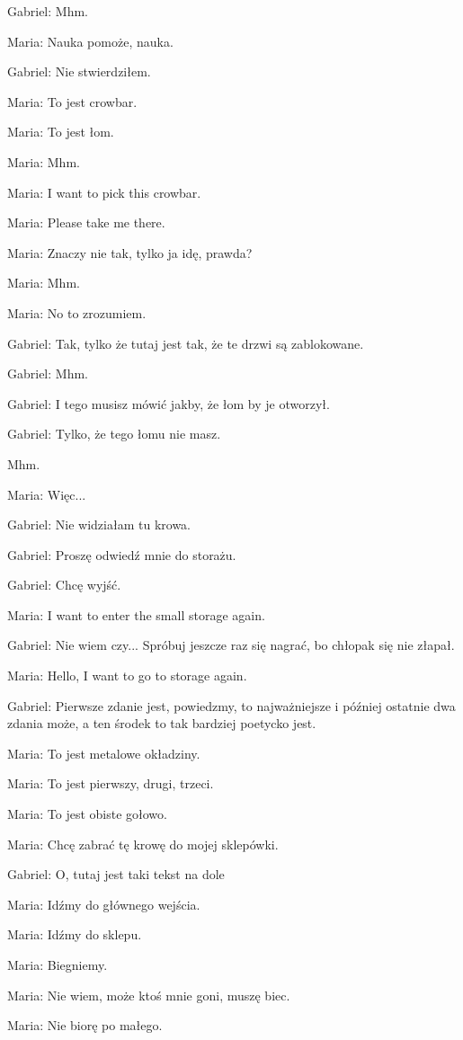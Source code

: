 Gabriel: Mhm.

Maria: Nauka pomoże, nauka.

Gabriel: Nie stwierdziłem.

Maria: To jest crowbar.

Maria: To jest łom.

Maria: Mhm.

Maria: I want to pick this crowbar.

Maria: Please take me there.

Maria: Znaczy nie tak, tylko ja idę, prawda?

Maria: Mhm.

Maria: No to zrozumiem.

Gabriel: Tak, tylko że tutaj jest tak, że te drzwi są zablokowane.

Gabriel: Mhm.

Gabriel: I tego musisz mówić jakby, że łom by je otworzył.

Gabriel: Tylko, że tego łomu nie masz.

Mhm.

Maria: Więc...

Gabriel: Nie widziałam tu krowa.

Gabriel: Proszę odwiedź mnie do storażu.

Gabriel: Chcę wyjść.

Maria: I want to enter the small storage again.

Gabriel: Nie wiem czy... Spróbuj jeszcze raz się nagrać, bo chłopak się nie złapał.

Maria: Hello, I want to go to storage again.

Gabriel: Pierwsze zdanie jest, powiedzmy, to najważniejsze i później ostatnie dwa zdania może, a ten środek to tak bardziej poetycko jest.

Maria: To jest metalowe okładziny.

Maria: To jest pierwszy, drugi, trzeci.

Maria: To jest obiste gołowo.

Maria: Chcę zabrać tę krowę do mojej sklepówki.

Gabriel: O, tutaj jest taki tekst na dole

Maria: Idźmy do głównego wejścia.

Maria: Idźmy do sklepu.

Maria: Biegniemy.

Maria: Nie wiem, może ktoś mnie goni, muszę biec.

Maria: Nie biorę po małego.

